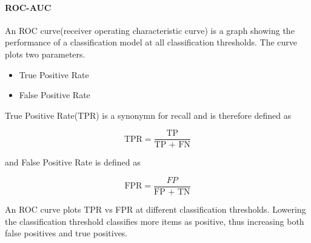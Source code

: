 \documentclass{book}
\begin{document}
%
%
%

\paragraph{ROC-AUC}%
An ROC curve(receiver operating characteristic curve) is a graph showing the performance of a classification model at all classification thresholds\cite{WEBSITE:20}. The curve plots two parameters.

\begin{itemize}
	\item True Positive Rate
	\item False Positive Rate
\end{itemize}

True Positive Rate(TPR) is a synonymn for recall and is therefore defined as

\begin{equation}
	\text{TPR} = \frac{\text{TP}}{\text{TP + FN}}
\end{equation}

and False Positive Rate is defined as

\begin{equation}
	\text{FPR} = \frac{FP}{\text{FP + TN}}
\end{equation}

An ROC curve  plots TPR vs FPR at different classification thresholds. Lowering the classification threshold classifies more items as positive, thus increasing both false positives and true positives.
\end{document}
